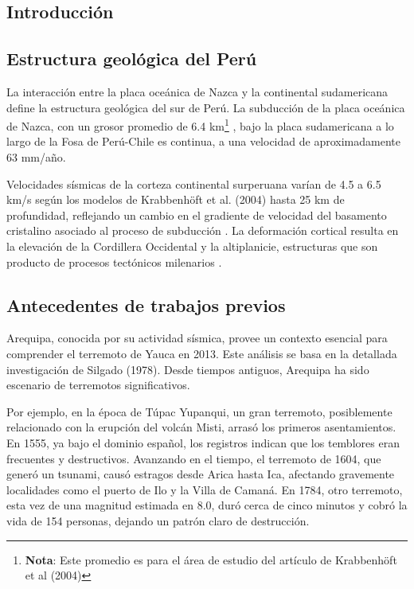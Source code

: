 \documentclass[spanish,a4paper,11pt]{article}
\begin{document}
\subsection{Introducción} 

\subsection*{Estructura geológica del Perú}

La interacción entre la placa oceánica de Nazca y la continental sudamericana define la estructura geológica del sur de Perú. La subducción de la placa oceánica de Nazca, con un grosor promedio de 6.4 km\footnote{\textbf{Nota}: Este promedio es para el área de estudio del artículo de Krabbenhöft et al (2004)} \cite{Krabbenhoft2004}, bajo la placa sudamericana a lo largo de la Fosa de Perú-Chile\cite{Krabbenhoft2004} es continua, a una velocidad de aproximadamente 63 mm/año\cite{VillegasLanza2016}.

Velocidades sísmicas de la corteza continental surperuana varían de 4.5 a 6.5 km/s según los modelos de Krabbenhöft et al. (2004) hasta 25 km de profundidad, reflejando un cambio en el gradiente de velocidad del basamento cristalino asociado al proceso de subducción \cite{Krabbenhoft2004}. La deformación cortical resulta en la elevación de la Cordillera Occidental y la altiplanicie, estructuras que son producto de procesos tectónicos milenarios \cite{VillegasLanza2016}.

\subsection*{Antecedentes de trabajos previos}

Arequipa, conocida por su actividad sísmica, provee un contexto esencial para comprender el terremoto de Yauca en 2013. Este análisis se basa en la detallada investigación de Silgado (1978). Desde tiempos antiguos, Arequipa ha sido escenario de terremotos significativos. 

Por ejemplo, en la época de Túpac Yupanqui, un gran terremoto, posiblemente relacionado con la erupción del volcán Misti, arrasó los primeros asentamientos. En 1555, ya bajo el dominio español, los registros indican que los temblores eran frecuentes y destructivos. Avanzando en el tiempo, el terremoto de 1604, que generó un tsunami, causó estragos desde Arica hasta Ica, afectando gravemente localidades como el puerto de Ilo y la Villa de Camaná. En 1784, otro terremoto, esta vez de una magnitud estimada en 8.0, duró cerca de cinco minutos y cobró la vida de 154 personas, dejando un patrón claro de destrucción. 
\end{document}
